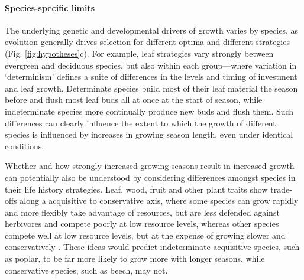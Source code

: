 \documentclass[11pt]{article}
\begin{document}
\paragraph{Species-specific limits}
The underlying genetic and developmental drivers of growth varies by species, as evolution generally drives selection for different optima and different strategies (Fig. \ref{fig:hypotheses}c). For example, leaf strategies vary strongly between evergreen and deciduous species, but also within each group---where variation in `determinism' defines a suite of differences in the levels and timing of investment and leaf growth. Determinate species build most of their leaf material the season before and flush most leaf buds all at once at the start of season, while indeterminate species more continually produce new buds and flush them. Such differences can clearly influence the extent to which the growth of different species is influenced by increases in growing season length, even under identical conditions.

Whether and how strongly increased growing seasons result in increased growth can potentially also be understood by considering differences amongst species in their life history strategies. Leaf, wood, fruit and other plant traits show trade-offs along a acquisitive to conservative axis, where some species can grow rapidly and more flexibly take advantage of resources, but are less defended against herbivores and compete poorly at low resource levels, whereas other species compete well at low resource levels, but at the expense of growing slower and conservatively \citep[][]{Grime:1977sw,diaz2016}. These ideas would predict indeterminate acquisitive species, such as poplar, to be far more likely to grow more with longer seasons, while conservative species, such as beech, may not.  %
\end{document}
